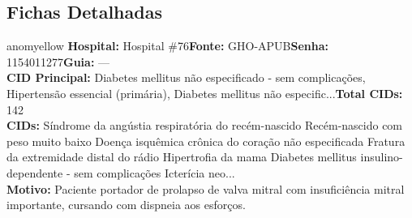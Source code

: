 \documentclass[a4paper,10pt]{article}
\begin{document}
\subsection{Fichas Detalhadas}
\begin{anomalycard}[Interna\c{c}\~{a}o \#483 | Pac. \#490 | MODERADO (z=2.54) | LOS: 26d | 25/02/2026\,$\to$\,—]{anomyellow}
\textbf{Hospital:} Hospital \#76\quad \textbf{Fonte:} GHO-APUB\quad \textbf{Senha:} 1154011277\quad \textbf{Guia:} ---\\

\textbf{CID Principal:} {\small Diabetes mellitus não especificado - sem complicações, Hipertensão essencial (primária), Diabetes mellitus não especific...}\quad\textbf{Total CIDs:} 142\\

\textbf{CIDs:} {\scriptsize Síndrome da angústia respiratória do recém-nascido \textbar{} Recém-nascido com peso muito baixo \textbar{} Doença isquêmica crônica do coração não especificada \textbar{} Fratura da extremidade distal do rádio \textbar{} Hipertrofia da mama \textbar{} Diabetes mellitus insulino-dependente - sem complicações \textbar{} Icterícia neo...}\\

\textbf{Motivo:} {\scriptsize Paciente  portador de prolapso de valva mitral com insuficiência mitral importante, cursando com dispneia aos esforços.}\\

\end{anomalycard}
\end{document}
